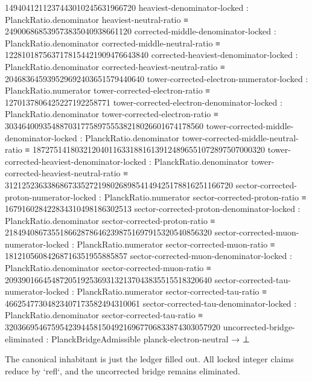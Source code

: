 \documentclass[11pt]{article}
\begin{document}
\begin{code}
      1494041211237443010245631966720
    heaviest-denominator-locked  :
      PlanckRatio.denominator heaviest-neutral-ratio ≡
      249006868539573835040938661120
    corrected-middle-denominator-locked :
      PlanckRatio.denominator corrected-middle-neutral-ratio ≡
      1228101875637178154421909476643840
    corrected-heaviest-denominator-locked :
      PlanckRatio.denominator corrected-heaviest-neutral-ratio ≡
      204683645939529692403651579440640
    tower-corrected-electron-numerator-locked :
      PlanckRatio.numerator tower-corrected-electron-ratio ≡
      1270137806425227192258771
    tower-corrected-electron-denominator-locked :
      PlanckRatio.denominator tower-corrected-electron-ratio ≡
      30346400935488703177589755538218026601674178560
    tower-corrected-middle-denominator-locked :
      PlanckRatio.denominator tower-corrected-middle-neutral-ratio ≡
      1872751418032120401163318816139124896551072897507000320
    tower-corrected-heaviest-denominator-locked :
      PlanckRatio.denominator tower-corrected-heaviest-neutral-ratio ≡
      312125236338686733527219802689854149425178816251166720
    sector-corrected-proton-numerator-locked :
      PlanckRatio.numerator sector-corrected-proton-ratio ≡
      167916028422834310498186302513
    sector-corrected-proton-denominator-locked :
      PlanckRatio.denominator sector-corrected-proton-ratio ≡
      2184940867355186628786462398751697915320540856320
    sector-corrected-muon-numerator-locked :
      PlanckRatio.numerator sector-corrected-muon-ratio ≡
      18121056084268716351955885857
    sector-corrected-muon-denominator-locked :
      PlanckRatio.denominator sector-corrected-muon-ratio ≡
      2093901664548720519253693132137043835515518320640
    sector-corrected-tau-numerator-locked :
      PlanckRatio.numerator sector-corrected-tau-ratio ≡
      46625477304823407173582494310061
    sector-corrected-tau-denominator-locked :
      PlanckRatio.denominator sector-corrected-tau-ratio ≡
      320366954675954239445815049216967706833874303057920
    uncorrected-bridge-eliminated :
      PlanckBridgeAdmissible planck-electron-neutral → ⊥
\end{code}

The canonical inhabitant is just the ledger filled out.  All locked integer
claims reduce by `refl`, and the uncorrected bridge remains eliminated.
\end{document}

